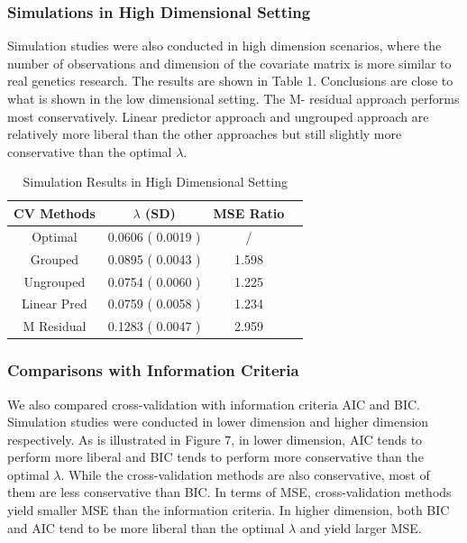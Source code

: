 \documentclass{article}\usepackage[]{graphicx}\usepackage[]{color}
\begin{document}
    \subsubsection {Simulations in High Dimensional Setting}

   Simulation studies were also conducted in high dimension scenarios, where the number of observations and dimension of the covariate matrix is more similar to real genetics research. The results are shown in Table 1. Conclusions are close to what is shown in the low dimensional setting. The M- residual approach performs most conservatively. Linear predictor approach and ungrouped approach are relatively more liberal than the other approaches but still slightly more conservative than the optimal $\lambda$.
  
  \begin{table}[h]
    \centering
			\begin{tabular}{ c | c | c | c}
				CV Methods & $\lambda$ (SD) & MSE Ratio \\
				\hline \hline
				Optimal  & 0.0606 ( 0.0019 )&  / & \\ 
				Grouped  &  0.0895  ( 0.0043 )& 1.598  \\
				Ungrouped & 0.0754 ( 0.0060 )& 1.225 \\
				Linear Pred & 0.0759 ( 0.0058 )& 1.234 \\
				M Residual &0.1283 ( 0.0047 ) & 2.959
			\end{tabular}
			\caption{Simulation Results in High Dimensional Setting}
	\end{table}
  
  
  \vspace{20 mm}
    \subsubsection {Comparisons with Information Criteria}
    \par We also compared cross-validation with information criteria AIC and BIC. Simulation studies were conducted in lower dimension and higher dimension respectively. As is illustrated in Figure 7, in lower dimension, AIC tends to perform more liberal and BIC tends to perform more conservative than the optimal $\lambda$. While the cross-validation methods are also conservative, most of them are less conservative than BIC. In terms of MSE, cross-validation methods yield smaller MSE than the information criteria. In higher dimension, both BIC and AIC tend to be more liberal than the optimal $\lambda$ and yield larger MSE.
\end{document}
